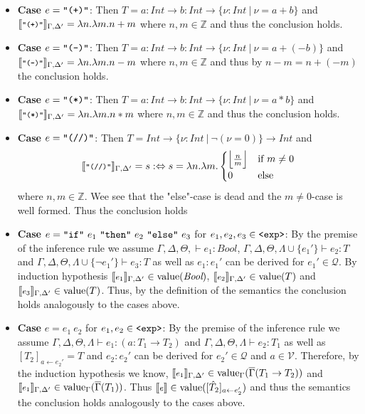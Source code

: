 \documentclass[]{scrbook}
\newcommand{\mf}[1]{\text{\texttt{#1}}}
\newcommand{\semantic}[1]{\llbracket \text{\footnotesize\texttt{#1}} \rrbracket}
\theoremstyle{definition}
\theoremstyle{definition}
\theoremstyle{definition}
\theoremstyle{remark}
\begin{document}
\begin{itemize}
    \item \textbf{Case} $e = \mf{"(+)"}$: Then $T =a:\mathit{Int}\to b:\mathit{Int}\to\{\nu:\mathit{Int} \ | \ \nu = a + b\}$ and $\semantic{"(+)"}_{\Gamma,\Delta'} = \lambda n.\lambda m. n + m$ where $n,m\in\mathbb{Z}$ and thus the conclusion holds.
    \item \textbf{Case} $e = \mf{"(-)"}$: Then $T =a:\mathit{Int}\to b:\mathit{Int}\to\{\nu:\mathit{Int} \ | \ \nu = a + (-b)\}$ and \(\semantic{"(-)"}_{\Gamma,\Delta'} = \lambda n.\lambda m. n - m\) where $n,m\in\mathbb{Z}$ and thus by $n - m = n + (-m)$ the conclusion holds.
    \item \textbf{Case} $e = \mf{"(*)"}$: Then $T = a:\mathit{Int}\to b:\mathit{Int}\to\{\nu:\mathit{Int} \ | \ \nu = a * b\}$ and \(\semantic{"(*)"}_{\Gamma,\Delta'} = \lambda n.\lambda m. n * m\) where $n,m\in\mathbb{Z}$
and thus the conclusion holds.
    \item \textbf{Case} $e = \mf{"(//)"}$: Then $T = \mathit{Int}\to\{\nu:\mathit{Int} \ | \ \neg (\nu = 0)\}\to\mathit{Int}$ and \[\semantic{"(//)"}_{\Gamma,\Delta'} = s:\Leftrightarrow 
s = \lambda n.\lambda m.\begin{cases} \Big\lfloor \frac{n}{m} \Big\rfloor& \text{if } m \neq 0\\
        0& \text{else}\end{cases}\] where $n,m\in\mathbb{Z}$. Wee see that the "else"-case is dead and the $m \neq 0$-case is well formed. Thus the conclusion holds
    \item \textbf{Case} $e = \mf{"if"} \ e_1  \ \mf{"then"} \ e_2 \ \mf{"else"} \ e_3$ for $e_1,e_2,e_3\in\mf{<exp>}$: By the premise of the inference rule we assume $\Gamma,\Delta,\Theta,\vdash e_1:\textit{Bool}$, $\Gamma,\Delta,\Theta,\Lambda\cup\{e_1'\}\vdash e_2: T$ and $\Gamma,\Delta,\Theta,\Lambda\cup\{\neg e_1'\}\vdash e_3: T$ as well as  $e_1:e_1'$ can be derived for $e_1'\in\mathcal{Q}$. By induction hypothesis $\semantic{$e_1$}_{\Gamma,\Delta'} \in \text{value}(\textit{Bool})$, $\semantic{$e_2$}_{\Gamma,\Delta'} \in \text{value}(T)$ and $\semantic{$e_3$}_{\Gamma,\Delta'} \in \text{value}(T)$.  Thus, by the definition of the semantics the conclusion holds analogously to the cases above.
    \item \textbf{Case} $e = e_1 \ e_2$ for $e_1,e_2\in\mf{<exp>}$: By the premise of the inference rule we assume $\Gamma,\Delta,\Theta,\Lambda\vdash e_1: (a:T_1\to T_2)$ and  $\Gamma,\Delta,\Theta,\Lambda\vdash e_2: T_1$ as well as $[T_2]_{a\leftarrow e_2'} =T$ and $e_2:e_2'$  can be derived for $e_2'\in\mathcal{Q}$ and $a\in\mathcal{V}$. Therefore, by the induction hypothesis we know, \(\semantic{$e_1$}_{\Gamma,\Delta'}\in\text{value}_\Gamma(\overline{\Gamma}(T_1\to T_2))\) and \(\semantic{$e_1$}_{\Gamma,\Delta'}\in\text{value}_\Gamma(\overline{\Gamma}(T_1))\). Thus $\semantic{$e$}\in\text{value}([\hat{T}_2]_{a\leftarrow e_2'})$ and thus the semantics the conclusion holds analogously to the cases above.

\end{itemize}
\end{document}
